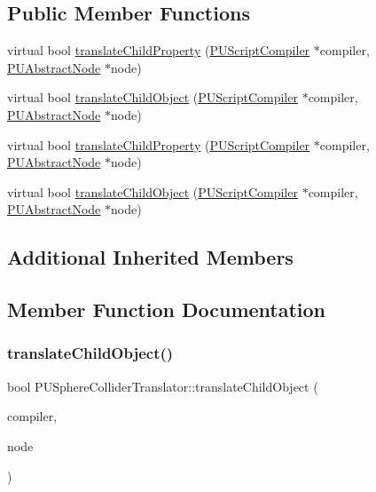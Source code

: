 \subsection*{Public Member Functions}
\begin{DoxyCompactItemize}
\item 
virtual bool \hyperlink{classPUSphereColliderTranslator_a2fefc53a967f3a27c7b6662524c835bd}{translate\+Child\+Property} (\hyperlink{classPUScriptCompiler}{P\+U\+Script\+Compiler} $\ast$compiler, \hyperlink{classPUAbstractNode}{P\+U\+Abstract\+Node} $\ast$node)
\item 
virtual bool \hyperlink{classPUSphereColliderTranslator_a8e516acee616a09d8b49e8b36140ef78}{translate\+Child\+Object} (\hyperlink{classPUScriptCompiler}{P\+U\+Script\+Compiler} $\ast$compiler, \hyperlink{classPUAbstractNode}{P\+U\+Abstract\+Node} $\ast$node)
\item 
virtual bool \hyperlink{classPUSphereColliderTranslator_a31cab609b82fed8cc69ac4893b3e171c}{translate\+Child\+Property} (\hyperlink{classPUScriptCompiler}{P\+U\+Script\+Compiler} $\ast$compiler, \hyperlink{classPUAbstractNode}{P\+U\+Abstract\+Node} $\ast$node)
\item 
virtual bool \hyperlink{classPUSphereColliderTranslator_a172b05b60718bde4249dcc2a3b384e02}{translate\+Child\+Object} (\hyperlink{classPUScriptCompiler}{P\+U\+Script\+Compiler} $\ast$compiler, \hyperlink{classPUAbstractNode}{P\+U\+Abstract\+Node} $\ast$node)
\end{DoxyCompactItemize}
\subsection*{Additional Inherited Members}


\subsection{Member Function Documentation}
\mbox{\label{classPUSphereColliderTranslator_a8e516acee616a09d8b49e8b36140ef78}} 
\subsubsection{\texorpdfstring{translate\+Child\+Object()}{translateChildObject()}\hspace{0.1cm}{\footnotesize\ttfamily [1/2]}}
{\footnotesize\ttfamily bool P\+U\+Sphere\+Collider\+Translator\+::translate\+Child\+Object (\begin{DoxyParamCaption}\item[{\hyperlink{classPUScriptCompiler}{P\+U\+Script\+Compiler} $\ast$}]{compiler,  }\item[{\hyperlink{classPUAbstractNode}{P\+U\+Abstract\+Node} $\ast$}]{node }\end{DoxyParamCaption})\hspace{0.3cm}{\ttfamily [virtual]}}

